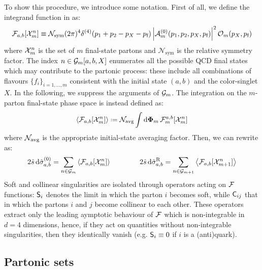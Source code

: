 To show this procedure, we introduce some notation\footnotemark. First of all, we define the integrand function in  as:
\begin{equation}
  \mathcal{F}_{a,b}[\mathcal{X}^{n}_{m}] \equiv \mathcal{N}_\text{sym} (2\pi)^4 \delta^{(4)}(p_1 + p_2 - p_X - p_\text{f}) \left\lvert\mathcal{A}_m^{(0)}(p_1, p_2, p_X, p_\text{f})\right\rvert^2 \mathcal{O}_m(p_X, p_\text{f})
\end{equation}
where $ \mathcal{X}^{n}_{m} $ is the set of $ m $ final-state partons and $ \mathcal{N}_\text{sym} $ is the relative symmetry factor. The index $ n \in \mathcal{G}_m[a,b,X] $ enumerates all the possible QCD final states which may contribute to the partonic process: these include all combinations of flavours $ \{f_i\}_{i = 1,\dots,m} $ consistent with the initial state $ (a,b) $ and the color-singlet $ X $. In the following, we suppress the arguments of $ \mathcal{G}_m $. The integration on the $ m $-parton final-state phase space is instead defined as:
\begin{equation}
  \ips{\flm_{a,b}[\fs{n}{m}]} \defeq \navg \int \lps_m \, \flm_m^{a,b}[\fs{n}{m}]
\end{equation}
where $ \mathcal{N}_\text{avg} $ is the appropriate initial-state averaging factor. Then, we can rewrite  as:
\begin{equation}
  2\hat{s}\, \mathrm{d}\hat{\sigma}_{a,b}^{(0)} = \sum_{n \in \mathcal{G}_m} \left\langle \mathcal{F}_{a,b}[\mathcal{X}^{n}_{m}] \right\rangle
  \qquad \qquad
  2\hat{s}\, \mathrm{d}\hat{\sigma}_{a,b}^\text{R} = \sum_{n \in \mathcal{G}_{m+1}} \left\langle \mathcal{F}_{a,b}[\mathcal{X}^{n}_{m+1}] \right\rangle
  \label{eq:lo-real}
\end{equation}
Soft and collinear singularities are isolated through operators acting on $ \mathcal{F} $ functions: $ \mathsf{S}_i $ denotes the limit in which the parton $ i $ becomes soft, while $ \mathsf{C}_{ij} $ that in which the partons $ i $ and $ j $ become collinear to each other. These operators extract only the leading aymptotic behaviour of $ \mathcal{F} $ which is non-integrable in $ d = 4 $ dimensions, hence, if they act on quantities without non-integrable singularities, then they identically vanish (e.g. $ \mathsf{S}_i \equiv 0 $ if $ i $ is a (anti)quark).


\subsection{Partonic sets}

